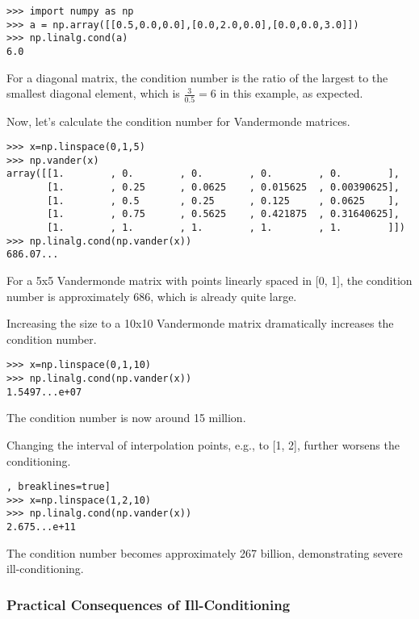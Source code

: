 \documentclass{article}
\begin{document}
\begin{lstlisting}[caption=Condition number calculation for a diagonal matrix, breaklines=true]
>>> import numpy as np
>>> a = np.array([[0.5,0.0,0.0],[0.0,2.0,0.0],[0.0,0.0,3.0]])
>>> np.linalg.cond(a)
6.0
\end{lstlisting}

For a diagonal matrix, the condition number is the ratio of the largest to the smallest diagonal element, which is $\frac{3}{0.5} = 6$ in this example, as expected.

Now, let's calculate the condition number for Vandermonde matrices.

\begin{lstlisting}[caption=Condition number calculation for a 5x5 Vandermonde matrix, breaklines=true]
>>> x=np.linspace(0,1,5)
>>> np.vander(x)
array([[1.        , 0.        , 0.        , 0.        , 0.        ],
       [1.        , 0.25      , 0.0625    , 0.015625  , 0.00390625],
       [1.        , 0.5       , 0.25      , 0.125     , 0.0625    ],
       [1.        , 0.75      , 0.5625    , 0.421875  , 0.31640625],
       [1.        , 1.        , 1.        , 1.        , 1.        ]])
>>> np.linalg.cond(np.vander(x))
686.07...
\end{lstlisting}

For a 5x5 Vandermonde matrix with points linearly spaced in [0, 1], the condition number is approximately 686, which is already quite large.

Increasing the size to a 10x10 Vandermonde matrix dramatically increases the condition number.

\begin{lstlisting}[caption=Condition number calculation for a 10x10 Vandermonde matrix, breaklines=true]
>>> x=np.linspace(0,1,10)
>>> np.linalg.cond(np.vander(x))
1.5497...e+07
\end{lstlisting}
The condition number is now around 15 million.

Changing the interval of interpolation points, e.g., to [1, 2], further worsens the conditioning.

\begin{lstlisting}[caption=Condition number calculation for a 10x10 Vandermonde matrix with points in [1, 2], breaklines=true]
>>> x=np.linspace(1,2,10)
>>> np.linalg.cond(np.vander(x))
2.675...e+11
\end{lstlisting}
The condition number becomes approximately 267 billion, demonstrating severe ill-conditioning.

\subsubsection{Practical Consequences of Ill-Conditioning}
\end{document}

